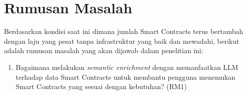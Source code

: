 \section{Rumusan Masalah}
\label{sec:rumusan-masalah}

Berdasarkan kondisi saat ini dimana jumlah Smart Contracts terus bertambah dengan laju yang pesat tanpa infrastruktur yang baik dan mewadahi, berikut adalah rumusan masalah yang akan dijawab dalam penelitian ini:
\begin{enumerate}
  


  \item Bagaimana melakukan \textit{semantic enrichment} dengan memanfaatkan LLM terhadap data Smart Contracts untuk membantu pengguna menemukan Smart Contracts yang sesuai dengan kebutuhan? (RM1)


\end{enumerate}
